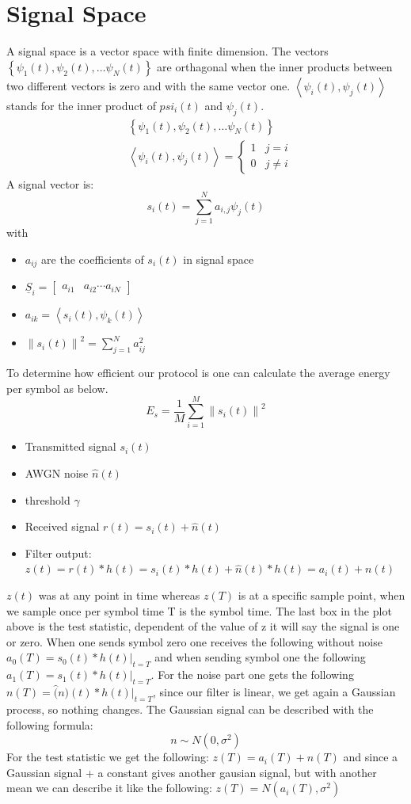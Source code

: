 \section{Signal Space}
A signal space is a vector space with finite dimension. The vectors $\left\{\psi_1(t), \psi_2(t), \ldots \psi_N(t)\right\}$ are orthagonal when the inner products between two different vectors is zero and with the same vector one. $\left\langle\psi_i(t), \psi_j(t)\right\rangle$ stands for the inner product of $psi_i(t)$ and $\psi_j(t)$.
$$
\begin{aligned}
&\left\{\psi_1(t), \psi_2(t), \ldots \psi_N(t)\right\} \\
&\left\langle\psi_i(t), \psi_j(t)\right\rangle= \begin{cases}1 & j=i \\
0 & j \neq i\end{cases}
\end{aligned}
$$
A signal vector is:
$$
s_i(t)=\sum_{j=1}^N a_{i, j} \psi_j(t)
$$
with
\begin{itemize}
\item $a_{i j}$ are the coefficients of $s_i(t)$ in signal space
\item $\underline{S}_i=\left[\begin{array}{ll}a_{i 1} & a_{i 2} \cdots a_{i N}\end{array}\right]$
\item $a_{i k}=\left\langle s_i(t), \psi_k(t)\right\rangle$
\item $\left\|s_i(t)\right\|^2=\sum_{j=1}^N a_{i j}^2$
\end{itemize}
To determine how efficient our protocol is one can calculate the average energy per symbol as below.
$$
E_s=\frac{1}{M} \sum_{i=1}^M\left\|s_i(t)\right\|^2
$$
\begin{itemize}
\item Transmitted signal $s_i(t)$
\item AWGN noise $\hat{n}(t)$
\item threshold $\gamma$
\item Received signal $r(t) = s_i(t) + \hat{n}(t)$
\item Filter output: $z(t)=r(t)*h(t)=s_i(t)*h(t)+\hat{n}(t)*h(t)=a_i(t)+n(t)$
\end{itemize}
$z(t)$ was at any point in time whereas $z(T)$ is at a specific sample point, when we sample once per symbol time T is the symbol time.
The last box in the plot above is the test statistic, dependent of the value of z it will say the signal is one or zero.\newline
When one sends symbol zero one receives the following without noise $a_0(T) = s_0(t)*h(t)\rvert_{t = T}$ and when sending symbol one the following $a_1(T) = s_1(t)*h(t)\rvert_{t = T}$. For the noise part one gets the following $n(T)=\hat(n)(t)*h(t)\rvert_{t = T}$, since our filter is linear, we get again a Gaussian process, so nothing changes. The Gaussian signal can be described with the following formula:
$$
n \sim N\left(0, \sigma^2\right)
$$
For the test statistic we get the following: $z(T)=a_i(T)+n(T)$ and since a Gaussian signal + a constant gives another gausian signal, but with another mean we can describe it like the following: $z(T)=N(a_i(T),\sigma^2)$
